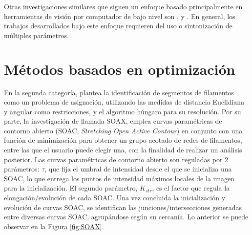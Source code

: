 Otras investigaciones similares que siguen un enfoque basado principalmente en herramientas de visi\'on por computador de bajo nivel son \citet{doi:10.1021/ma502264c},\citet{lichtenstein2003quantitative} y \citet{asgharzadeh2018computational}. En general, los trabajos desarrollados bajo este enfoque requieren del uso o sintonizaci\'on de m\'ultiples par\'ametros.




\section{M\'etodos basados en optimizaci\'on}
\label{sec:OptiMethods}
En la segunda categor\'ia, \citet{cerda2014geometrical} plantea la identificaci\'on de segmentos de filamentos como un problema de asignaci\'on, utilizando las medidas de distancia Euclidiana y angular como restricciones, y el algoritmo h\'ungaro para su resoluci\'on.
Por su parte, la investigaci\'on de \citet{xu2015soax} llamada SOAX, emplea curvas param\'etricas de contorno abierto (SOAC, {\it Stretching Open Active Contour}) en conjunto con una funci\'on de minimizaci\'on para obtener un grupo acotado de redes de filamentos, entre las que el usuario puede elegir una, con la finalidad de realizar un an\'alisis posterior. Las curvas param\'etricas de contorno abierto son reguladas por 2 par\'ametros: $\tau$, que fija el umbral de intensidad desde el que se inicializa una SOAC, lo que entrega los puntos de intensidad m\'aximos locales de la imagen para la inicializaci\'on. El segundo par\'ametro, $K_{str}$, es el factor que regula la elongaci\'on/evoluci\'on de cada SOAC. Una vez concluida la inicializaci\'on y evoluci\'on de curvas SOAC, se identifican las junciones/intersecciones generadas entre diversas curvas SOAC, agrup\'andose seg\'un su cercan\'ia. Lo anterior se puede observar en la Figura \ref{fig:SOAX}.

